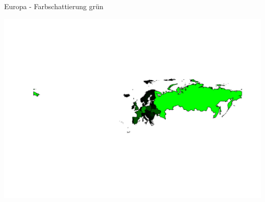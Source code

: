 \documentclass[ignorenonframetext,]{beamer}
\newenvironment{Shaded}{\begin{snugshade}}{\end{snugshade}}
\newcommand{\DataTypeTok}[1]{\textcolor[rgb]{0.74,0.68,0.62}{\underline{#1}}}
\newcommand{\DecValTok}[1]{\textcolor[rgb]{0.27,0.67,0.26}{#1}}
\newcommand{\KeywordTok}[1]{\textcolor[rgb]{0.26,0.66,0.93}{\textbf{#1}}}
\newcommand{\NormalTok}[1]{\textcolor[rgb]{0.74,0.68,0.62}{#1}}
\newcommand{\OperatorTok}[1]{\textcolor[rgb]{0.74,0.68,0.62}{#1}}
\newcommand{\StringTok}[1]{\textcolor[rgb]{0.02,0.61,0.04}{#1}}
\begin{document}
\begin{frame}[fragile]{Europa - Farbschattierung grün}
\protect\hypertarget{europa---farbschattierung-grun}{}

\begin{Shaded}
\end{Shaded}

\includegraphics{Geomedizin_files/figure-beamer/unnamed-chunk-81-1.pdf}

\end{frame}
\end{document}
